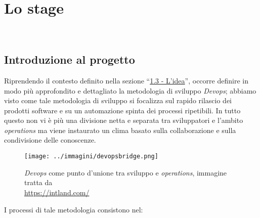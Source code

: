 
\pagestyle{IHA-fancy-style}
\chapter{Lo stage}
\label{cap:lo-stage}

\\

\section{Introduzione al progetto}

Riprendendo il contesto definito nella sezione ``{\hyperref[sec:idea]{1.3 - L'idea}}'', occorre definire in modo più approfondito e dettagliato la metodologia di sviluppo \textit{Devops}; abbiamo visto come tale metodologia di sviluppo si focalizza sul rapido rilascio dei prodotti software e su un automazione spinta dei processi ripetibili. In tutto questo non vi è più una divisione netta e separata tra sviluppatori e l'ambito \textit{operations} ma viene instaurato un clima basato sulla collaborazione e sulla condivisione delle conoscenze. 

\begin{figure}[H]
    \capstart
    \centering
    \texttt{[image: ../immagini/devopsbridge.png]}
    \caption[\textit{Devops} come punto d'unione tra sviluppo e \textit{operations}]{\textit{Devops} come punto d'unione tra sviluppo e \textit{operations}, immagine tratta da \\ \url{https://intland.com/}}
\end{figure}

I processi di tale metodologia consistono nel:

